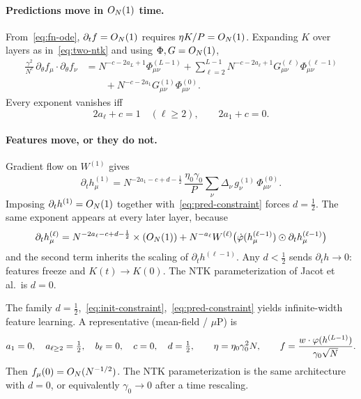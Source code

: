 \paragraph{Predictions move in $O_{N}(1)$ time.}
From~\eqref{eq:fn-ode}, $\partial_t f=O_{N}(1)$ requires $\eta K/P=O_{N}(1)$. Expanding $K$ over layers as in~\eqref{eq:two-ntk} and using $\Phi,G=O_{N}(1)$,
\begin{equation}
\begin{split}
  \frac{\gamma^2}{N^{c}}\,\partial_\theta f_\mu\cdot\partial_\theta f_\nu
  &=
  N^{-c-2a_L+1}\Phi^{(L-1)}_{\mu\nu}
  +\sum_{\ell=2}^{L-1} N^{-c-2a_\ell+1} G^{(\ell)}_{\mu\nu}\Phi^{(\ell-1)}_{\mu\nu}\\
  &\qquad
  +N^{-c-2a_1} G^{(1)}_{\mu\nu}\Phi^{(0)}_{\mu\nu}.
\end{split}
  \label{eq:K-expand}
\end{equation}
Every exponent vanishes iff
\begin{equation}
  2a_\ell+c=1\quad(\ell\ge 2),
  \qquad
  2a_1+c=0.
  \label{eq:pred-constraint}
\end{equation}

\paragraph{Features move, or they do not.}
Gradient flow on $W^{(1)}$ gives
\begin{equation}
  \partial_t h^{(1)}_\mu
  =N^{-2a_1-c+d-\frac12}\,
  \frac{\eta_0\gamma_0}{P}\sum_{\nu}\Delta_\nu\, g^{(1)}_\nu\,\Phi^{(0)}_{\mu\nu}.
  \label{eq:h1-dot}
\end{equation}
Imposing $\partial_t h^{(1)}=O_{N}(1)$ together with~\eqref{eq:pred-constraint} forces $d=\tfrac12$. The same exponent appears at every later layer, because
\begin{equation}
  \partial_t h^{(\ell)}_\mu
  =N^{-2a_\ell-c+d-\frac12}\times(O_{N}(1))
  +N^{-a_\ell}W^{(\ell)}\bigl(\dot{\varphi}(h^{(\ell-1)}_\mu)\odot\partial_t h^{(\ell-1)}_\mu\bigr)
  \label{eq:hl-dot}
\end{equation}
and the second term inherits the scaling of $\partial_t h^{(\ell-1)}$. Any $d<\tfrac12$ sends $\partial_t h\to 0$: features freeze and $K(t)\to K(0)$. The NTK parameterization of Jacot et al.\ is $d=0$.

\begin{proposition}
The family $d=\tfrac12$,~\eqref{eq:init-constraint},~\eqref{eq:pred-constraint} yields infinite-width feature learning. A representative (mean-field / $\mu$P) is
\begin{equation}
  a_1=0,\quad
  a_{\ell\ge 2}=\tfrac12,\quad
  b_\ell=0,\quad
  c=0,\quad
  d=\tfrac12,
  \qquad
  \eta=\eta_0\gamma_0^2 N,
  \qquad
  f=\frac{w\cdot\varphi(h^{(L-1)})}{\gamma_0\sqrt{N}}.
  \label{eq:mup}
\end{equation}
Then $f_\mu(0)=O_{N}(N^{-1/2})$. The NTK parameterization is the same architecture with $d=0$, or equivalently $\gamma_0\to 0$ after a time rescaling.
\end{proposition}

